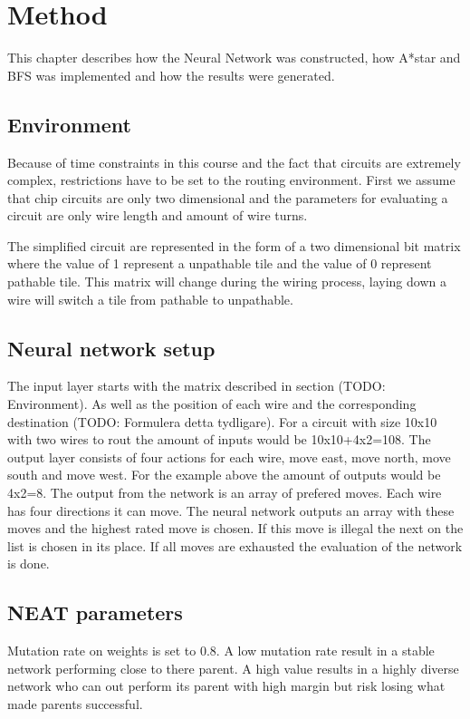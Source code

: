 \documentclass{kththesis}
\begin{document}
\chapter{Method}
This chapter describes how the Neural Network was constructed, how A*star and BFS was implemented and how the results were generated.
\section{Environment}
Because of time constraints in this course and the fact that circuits are extremely complex, restrictions have to be set to the routing environment. First we assume that chip circuits are only two dimensional and the parameters for evaluating a circuit are only wire length and amount of wire turns.

The simplified circuit are represented in the form of a two dimensional bit matrix where the value of 1 represent a unpathable tile and the value of 0 represent pathable tile. This matrix will change during the wiring process, laying down a wire will switch a tile from pathable to unpathable. 

\section{Neural network setup}
The input layer starts with the matrix described in section (TODO: Environment). As well as the position of each wire and the corresponding destination (TODO: Formulera detta tydligare). For a circuit with size 10x10 with two wires to rout the amount of inputs would be 10x10+4x2=108. The output layer consists of four actions for each wire, move east, move north, move south and move west. For the example above the amount of outputs would be 4x2=8.
The output from the network is an array of prefered moves. Each wire has four directions it can move. The neural network outputs an array with these moves and the highest rated move is chosen. If this move is illegal the next on the list is chosen in its place. If all moves are exhausted the evaluation of the network is done.

\section{NEAT parameters}
Mutation rate on weights is set to 0.8. A low mutation rate result in a stable network performing close to there parent. A high value results in a highly diverse network who can out perform its parent with high margin but risk losing what made parents successful.
\end{document}
